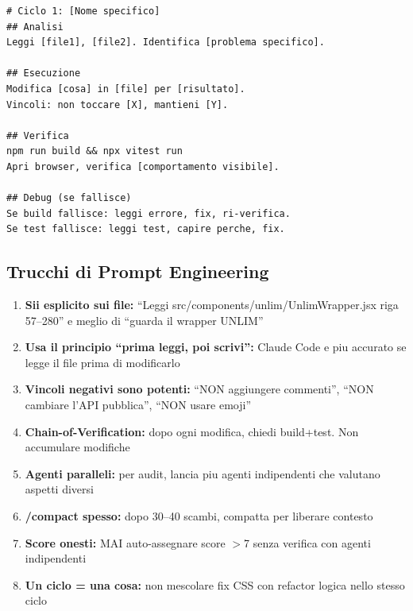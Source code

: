 \documentclass[11pt,a4paper]{article}
\begin{document}
\begin{lstlisting}[title=Esempio prompt a strati]
# Ciclo 1: [Nome specifico]
## Analisi
Leggi [file1], [file2]. Identifica [problema specifico].

## Esecuzione
Modifica [cosa] in [file] per [risultato].
Vincoli: non toccare [X], mantieni [Y].

## Verifica
npm run build && npx vitest run
Apri browser, verifica [comportamento visibile].

## Debug (se fallisce)
Se build fallisce: leggi errore, fix, ri-verifica.
Se test fallisce: leggi test, capire perche, fix.
\end{lstlisting}

\subsection{Trucchi di Prompt Engineering}

\begin{enumerate}[leftmargin=2em]
  \item \textbf{Sii esplicito sui file:} ``Leggi src/components/unlim/UnlimWrapper.jsx riga 57--280'' e meglio di ``guarda il wrapper UNLIM''

  \item \textbf{Usa il principio ``prima leggi, poi scrivi'':} Claude Code e piu accurato se legge il file prima di modificarlo

  \item \textbf{Vincoli negativi sono potenti:} ``NON aggiungere commenti'', ``NON cambiare l'API pubblica'', ``NON usare emoji''

  \item \textbf{Chain-of-Verification:} dopo ogni modifica, chiedi build+test. Non accumulare modifiche

  \item \textbf{Agenti paralleli:} per audit, lancia piu agenti indipendenti che valutano aspetti diversi

  \item \textbf{/compact spesso:} dopo 30--40 scambi, compatta per liberare contesto

  \item \textbf{Score onesti:} MAI auto-assegnare score $>$7 senza verifica con agenti indipendenti

  \item \textbf{Un ciclo = una cosa:} non mescolare fix CSS con refactor logica nello stesso ciclo
\end{enumerate}
\end{document}
